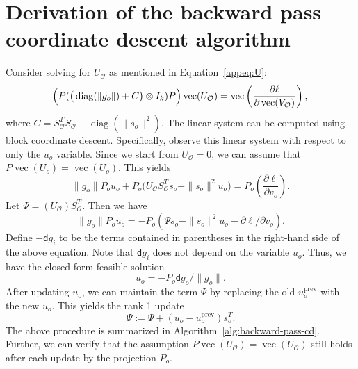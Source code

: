 \documentclass{article}
\DeclareMathOperator{\diag}{diag}
\DeclareMathOperator{\vect}{vec}
\newcommand{\norm}[1] {\|#1\|}
\newcommand{\dd}{\mathsf{d}}
\newcommand{\outdex}{o}
\newcommand{\outset}{\mathcal{O}}
\begin{document}
	\section{Derivation of the backward pass coordinate descent algorithm}
	\label{appsec:back-cd}
	Consider solving for $U_{\outset}$ as mentioned in Equation~\eqref{appeq:U}:
	\begin{equation*}
		\Big(P(\big(\diag(\norm{g_{\outdex}})+C\big) \otimes I_k)P\Big)\vect(U_{\outset})=\vect\left(\frac{\partial\ell}{\partial \vect(V_{\outset})}\right) ,\\
	\end{equation*}
	where $C = S_{\outset}^T S_{\outset} - \diag(\norm{s_{\outdex}}^2)$.
	The linear system can be computed using block coordinate descent.
	Specifically, observe this linear system with respect to only the $u_{\outdex}$ variable. Since we start from $U_{\outset}=0$, we can assume that $P\vect(U_{\outdex})=\vect(U_{\outdex})$. This yields
	\begin{equation}
		\norm{g_{\outdex}} P_\outdex u_{\outdex} +  P_{\outdex}\Big(U_{\outset} S^T_{\outset} s_{\outdex} - \norm{s_{\outdex}}^2 u_{\outdex}\Big) = P_{\outdex}\left(\frac{\partial\ell}{\partial v_{\outdex}}\right).
	\end{equation}
	Let $\Psi = (U_{\outset})S^T_{\outset}$. Then we have
	\begin{equation}
		\norm{g_{\outdex}}P_{\outdex}u_{\outdex} = - P_{\outdex}(\Psi s_{\outdex}-\norm{s_{\outdex}}^2 u_{\outdex} - \partial\ell/\partial v_{\outdex}).
	\end{equation}
	Define $-\dd g_i$ to be the terms contained in parentheses in the right-hand side of the above equation. Note that $\dd g_i$ does not depend on the variable $u_{\outdex}$. Thus, we have the closed-form feasible solution
	\begin{equation}
		u_{\outdex} = -P_{\outdex}\dd g_{\outdex} / \norm{g_{\outdex}}.
	\end{equation}
	After updating $u_{\outdex}$, we can maintain the term $\Psi$ by replacing the old $u^{\text{prev}}_{\outdex}$ with the new $u_{\outdex}$. This yields the rank 1 update
	\begin{equation}
		\Psi := \Psi + (u_{\outdex}-u^{\text{prev}}_{\outdex})s_{\outdex}^T.
	\end{equation}
	The above procedure is summarized in Algorithm~\ref{alg:backward-pass-cd}. Further, we can verify that the assumption $P\vect(U_{\outset})=\vect(U_{\outset})$ still holds after each update by the projection $P_{\outdex}$.
	
\end{document}
